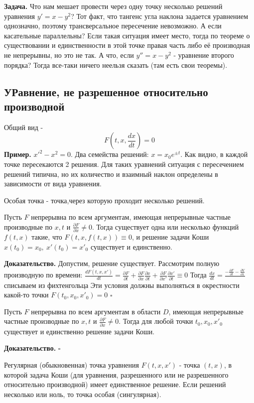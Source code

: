 \textbf{Задача.} Что нам мешает провести через одну точку несколько
решений уравнения $y'=x-y^2$? Тот факт, что тангенс угла наклона задается
уравнением однозначно, поэтому трансверсальное пересечение невозможно.
А если касательные параллельны? Если такая ситуация имеет место, тогда по 
теореме о существовании и единственности в этой точке правая часть либо
её производная не непрерывны, но это не так. А что, если $y''=x-y^2$ - 
уравнение второго порядка? Тогда все-таки ничего неельзя сказать (там есть
свои теоремы). 
\subsection{УРавнение, не разрешенное относительно производной}
Общий вид - 
$$F\left( t,x,\frac{dx}{dt} \right) = 0$$ 
\textbf{Пример.} $x'^2-x^2=0$. Два семейства решений:
$x=x_0e^{\pm t}$. Как видно, в каждой точке пересекаются 2 решения. 
Для таких уравнений  ситуация с пересечением решений 
типична, но их количество и взаимный наклон определены в зависимости от вида
уравнения.
\begin{defin}
Особая точка - точка,через которую проходит несколько решений.
\end{defin}
\begin{theor}
Пусть $F$ непрерывна по всем аргументам, имеющая непрерывные частные 
производные по  $x,t$ и  $\frac{\partial F}{\partial x}\ne 0$. Тогда
существует одна или несколько функций $f(t,x)$ такие, что 
$F(t,x,f(t,x))\equiv0$, и решение задачи Коши $x(t_0)=x_0,~x'(t_0)=x'_0$
существует и единственно. 
\end{theor}
\textbf{Доказательство.}  
Допустим, решение существует.
Рассмотрим полную производную по времени: 
$\frac{dF(t,x,x')}{dt}=\frac{\partial F}{\partial t}+
 \frac{\partial F}{\partial x}\frac{\partial x}{\partial t} +
 \frac{\partial F}{\partial x'}\frac{\partial x'}{\partial t}\equiv 0$
Тогда $\frac{dx}{dt}=\frac{-\frac{\partial F}{\partial t} -
\frac{\partial V}{\partial x} }{}$ списываем из фихтенгольца
Эти условия должны выполняться в окрестности какой-то точки
$F(t_0,x_0,x'_0)=0$ $\square$ \\
\begin{theor}
Пусть $F$ непрерывна по всем аргументам в области $D$,
имеющая непрерывные частные 
производные по  $x,t$ и  $\frac{\partial F}{\partial x}\ne 0$. Тогда
для любой точки $t_0,x_0,x'_0$ существует и единственно решение задачи Коши. 
\end{theor}
\textbf{Доказательство.}  
$\square$ \\
\begin{defin}
Регулярная (обыкновенная) точка уравнения $F(t,x,x')$ - точка $(t,x)$, 
в которой задача Коши (для уравнения, разрешенного или не разрешенного 
относительно производной) имеет единственное решение. Если решений несколько
или ноль, то точка особая (сингулярная).
\end{defin}

